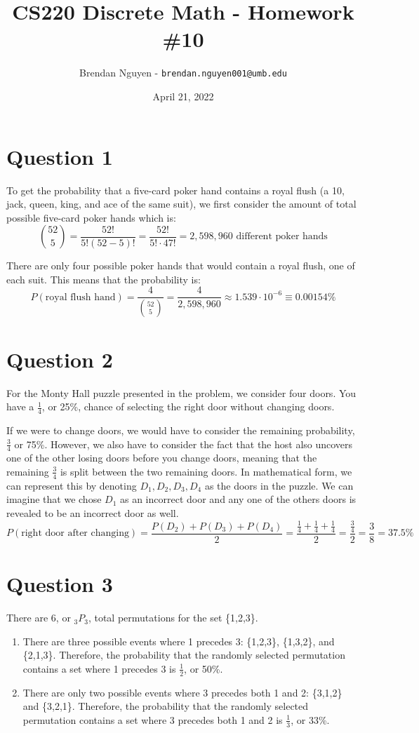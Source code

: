 \documentclass[letterpaper, 12pt]{article}
\title{CS220 Discrete Math - Homework \#10}
\author{Brendan Nguyen - \texttt{brendan.nguyen001@umb.edu}}
\date{April 21, 2022}
\begin{document}
\maketitle

\section*{Question 1}
To get the probability that a five-card poker hand contains a royal flush (a 10, jack, queen, king, and ace of the same suit), we first consider the amount of total possible five-card poker hands which is:
\[\binom{52}{5} = \frac{52!}{5!(52-5)!} = \frac{52!}{5! \cdot 47!} = 2,598,960 \text{ different poker hands}\]

There are only four possible poker hands that would contain a royal flush, one of each suit. This means that the probability is:
\[P(\text{royal flush hand}) = \frac{4}{\binom{52}{5}} = \frac{4}{2,598,960} \approx 1.539 \cdot 10^{-6} \equiv 0.00154\%\]

\section*{Question 2}
For the Monty Hall puzzle presented in the problem, we consider four doors. You have a $\frac{1}{4}$, or 25\%, chance of selecting the right door without changing doors. 

If we were to change doors, we would have to consider the remaining probability, $\frac{3}{4}$ or 75\%. However, we also have to consider the fact that the host also uncovers one of the other losing doors before you change doors, meaning that the remaining $\frac{3}{4}$ is split between the two remaining doors. In mathematical form, we can represent this by denoting $D_1, D_2, D_3, D_4$ as the doors in the puzzle. We can imagine that we chose $D_1$ as an incorrect door and any one of the others doors is revealed to be an incorrect door as well.
\[P(\text{right door after changing}) = \frac{P(D_2) + P(D_3) + P(D_4)}{2} = \frac{\frac{1}{4} + \frac{1}{4} + \frac{1}{4}}{2} = \frac{\frac{3}{4}}{2} = \frac{3}{8} = 37.5\%\]

\section*{Question 3}
There are 6, or $_{3}P_{3}$, total permutations for the set \{1,2,3\}.

\begin{enumerate}
    \item There are three possible events where 1 precedes 3: \{1,2,3\}, \{1,3,2\}, and \{2,1,3\}. Therefore, the probability that the randomly selected permutation contains a set where 1 precedes 3 is $\frac{1}{2}$, or 50\%.
    \item There are only two possible events where 3 precedes both 1 and 2: \{3,1,2\} and \{3,2,1\}. Therefore, the probability that the randomly selected permutation contains a set where 3 precedes both 1 and 2 is $\frac{1}{3}$, or 33\%.
\end{enumerate}
\end{document}
